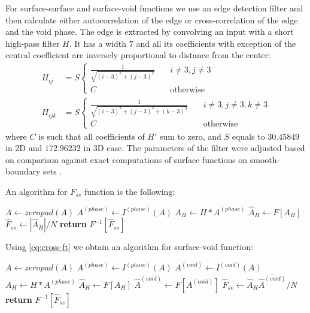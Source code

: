 \documentclass[reprint,amsmath,amssymb,aps,pre,showkeys,showpacs,nofootinbib]{revtex4-1}
\begin{document}
For surface-surface and surface-void functions we use an edge detection filter
\cite{samarin2023robust} and then calculate either autocorrelation of the edge
or cross-correlation of the edge and the void phase. The edge is extracted by
convolving an input with a short high-pass filter $H$. It has a width $7$ and
all its coefficients with exception of the central coefficient are inversely
proportional to distance from the center:
\begin{equation}
  \begin{aligned}
    H_{ij} &= S \left\{
    \begin{array}{cc}
      \frac{1}{\sqrt{(i-3)^2 + (j-3)^2}} & \quad i \ne 3, j \ne 3 \\
      C & \quad \text{otherwise}
    \end{array}
    \right. \\
    H_{ijk} &= S \left\{
    \begin{array}{cc}
      \frac{1}{\sqrt{(i-3)^2 + (j-3)^2 + (k-3)^3}} & \quad i \ne 3, j \ne 3, k
      \ne 3 \\
      C & \quad \text{otherwise}
    \end{array}
    \right.
  \end{aligned}
  \label{eq:filter-7x7}
\end{equation}
where $C$ is such that all coefficients of $H'$ sum to zero, and $S$ equals to
$30.45849$ in 2D and $172.96232$ in 3D case. The parameters of the filter were adjusted
based on comparison against exact computations of surface functions on smooth-boundary
sets \cite{Postnicov2023}.

An algorithm for $F_{ss}$ function is the following:
\begin{algorithmic}[1]
    \State $A \gets zeropad(A)$
  \EndIf
  \State $A^{(phase)} \gets I^{(phase)} (A)$
  \State $A_H \gets H * A^{(phase)}$
  \State $\hat{A}_H \gets F[A_H]$
  \State $\hat{F}_{ss} \gets |\hat{A}_H| / N$
  \State \textbf{return} $F^{-1} [\hat{F}_{ss}]$
  \EndProcedure
\end{algorithmic}

Using \cref{eq:cross-ft} we obtain an algorithm for surface-void function:
\begin{algorithmic}[1]
    \State $A \gets zeropad(A)$
  \EndIf
  \State $A^{(phase)} \gets I^{(phase)} (A)$
  \State $A^{(void)} \gets I^{(void)} (A)$
  \State $A_H \gets H * A^{(phase)}$
  \State $\hat{A}_H \gets F[A_H]$
  \State $\hat{A}^{(void)} \gets F[A^{(void)}]$
  \State $\hat{F}_{sv} \gets \hat{A}_H \overline{\hat{A}^{(void)}} / N$
  \State \textbf{return} $F^{-1} [\hat{F}_{sv}]$
  \EndProcedure
\end{algorithmic}
\end{document}
